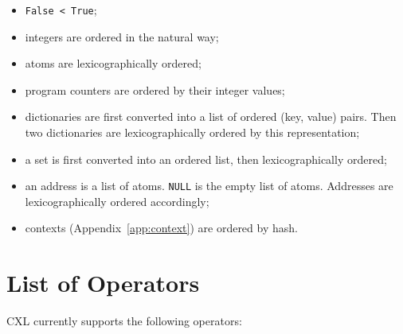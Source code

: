\documentclass{report}
\begin{document}
\begin{itemize}
\item \texttt{False < True};
\item integers are ordered in the natural way;
\item atoms are lexicographically ordered;
\item program counters are ordered by their integer values;
\item dictionaries are first converted into a list of ordered (key, value)
pairs.  Then two dictionaries are lexicographically ordered by this
representation;
\item a set is first converted into an ordered list, then lexicographically
ordered;
\item an address is a list of atoms.  \texttt{NULL} is the empty list of atoms.
Addresses are lexicographically ordered accordingly;
\item contexts (Appendix~\ref{app:context}) are ordered by hash.
\end{itemize}

\chapter{List of Operators}

CXL currently supports the following operators:
\end{document}
